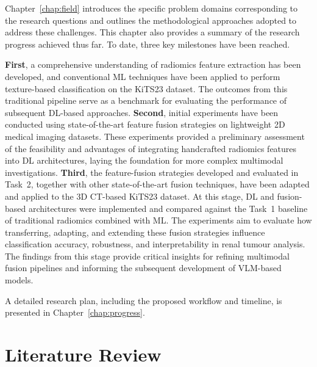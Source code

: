 \documentclass[final,british,a4paper,12pt]{phdthesis}
\begin{document}
Chapter~\ref{chap:field} introduces the specific problem domains corresponding to the research questions and outlines the methodological approaches adopted to address these challenges. This chapter also provides a summary of the research progress achieved thus far. To date, three key milestones have been reached. 

\textbf{First}, a comprehensive understanding of radiomics feature extraction has been developed, and conventional ML techniques have been applied to perform texture-based classification on the KiTS23 dataset. The outcomes from this traditional pipeline serve as a benchmark for evaluating the performance of subsequent DL-based approaches. \textbf{Second}, initial experiments have been conducted using state-of-the-art feature fusion strategies on lightweight 2D medical imaging datasets. These experiments provided a preliminary assessment of the feasibility and advantages of integrating handcrafted radiomics features into DL architectures, laying the foundation for more complex multimodal investigations. \textbf{Third}, the feature-fusion strategies developed and evaluated in Task~2, together with other state-of-the-art fusion techniques, have been adapted and applied to the 3D CT-based KiTS23 dataset. At this stage, DL and fusion-based architectures were implemented and compared against the Task~1 baseline of traditional radiomics combined with ML. The experiments aim to evaluate how transferring, adapting, and extending these fusion strategies influence classification accuracy, robustness, and interpretability in renal tumour analysis. The findings from this stage provide critical insights for refining multimodal fusion pipelines and informing the subsequent development of VLM-based models.



A detailed research plan, including the proposed workflow and timeline, is presented in Chapter~\ref{chap:progress}.


    

\chapter{Literature Review}\label{chap:survey}
\end{document}
